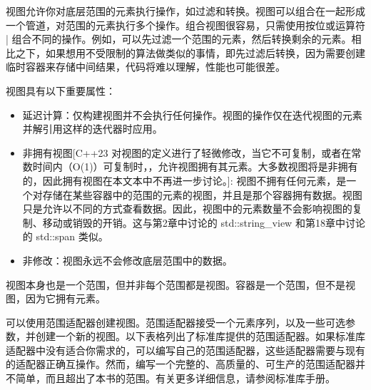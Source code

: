 
视图允许你对底层范围的元素执行操作，如过滤和转换。视图可以组合在一起形成一个管道，对范围的元素执行多个操作。组合视图很容易，只需使用按位或运算符 | 组合不同的操作。例如，可以先过滤一个范围的元素，然后转换剩余的元素。相比之下，如果想用不受限制的算法做类似的事情，即先过滤后转换，因为需要创建临时容器来存储中间结果，代码将难以理解，性能也可能很差。

视图具有以下重要属性：

\begin{itemize}
\item
延迟计算：仅构建视图并不会执行任何操作。视图的操作仅在迭代视图的元素并解引用这样的迭代器时应用。

\item
非拥有视图[C++23 对视图的定义进行了轻微修改，当它不可复制，或者在常数时间内（O(1)）可复制时，，允许视图拥有其元素。大多数视图将是非拥有的，因此拥有视图在本文本中不再进一步讨论。]: 视图不拥有任何元素，是一个对存储在某些容器中的范围的元素的视图，并且是那个容器拥有数据。视图只是允许以不同的方式查看数据。因此，视图中的元素数量不会影响视图的复制、移动或销毁的开销。这与第2章中讨论的 std::string\_view 和第18章中讨论的 std::span 类似。

\item
非修改：视图永远不会修改底层范围中的数据。
\end{itemize}

视图本身也是一个范围，但并非每个范围都是视图。容器是一个范围，但不是视图，因为它拥有元素。

可以使用范围适配器创建视图。范围适配器接受一个元素序列，以及一些可选参数，并创建一个新的视图。以下表格列出了标准库提供的范围适配器。如果标准库适配器中没有适合你需求的，可以编写自己的范围适配器，这些适配器需要与现有的适配器正确互操作。然而，编写一个完整的、高质量的、可生产的范围适配器并不简单，而且超出了本书的范围。有关更多详细信息，请参阅标准库手册。

